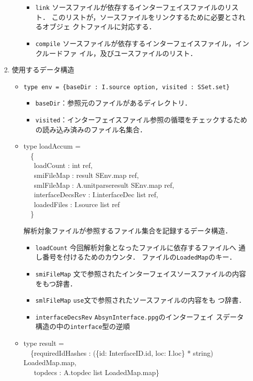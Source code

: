 \documentclass{jbook}
\newcommand{\code}[1]{\mbox{\large\tt #1}}
\newcommand{\myem}{\mbox{\ \ }}
\newenvironment{programPlain}{\begin{large}\begin{tt}}%
	                     {\end{tt}\end{large}}
\begin{document}
\begin{enumerate}
\begin{itemize}
\begin{itemize}
\item \code{link}
	ソースファイルが依存するインターフェイスファイルのリスト．
	このリストが，ソースファイルをリンクするために必要とされるオブジェ
クトファイルに対応する．

\item \code{compile}
	ソースファイルが依存するインターフェイスファイル，インクルードファ
イル，及びユースファイルのリスト．
\end{itemize}
\end{itemize}
\item 使用するデータ構造
\begin{itemize}
\item \code{type env = \{baseDir : I.source option, visited : SSet.set\}}
\begin{itemize}
\item \code{baseDir}：参照元のファイルがあるディレクトリ．
\item \code{visited}：インターフェイスファイル参照の循環をチェックするための読み込み済みのファイル名集合．
\end{itemize}
	
\item 
\begin{programPlain}
type loadAccum =\\
\myem      \{\\
\myem\         loadCount : int ref,\\
\myem\         smiFileMap : result SEnv.map ref,\\
\myem\         smlFileMap : A.unitparseresult SEnv.map ref,\\
\myem\         interfaceDecsRev : I.interfaceDec list ref,\\
\myem\         loadedFiles : I.source list ref\\
\myem       \}
\end{programPlain}

	解析対象ファイルが参照するファイル集合を記録するデータ構造．
\begin{itemize}
\item \code{loadCount} 今回解析対象となったファイルに依存するファイルへ
通し番号を付けるためのカウンタ．
	ファイルの\code{LoadedMap}のキー．
\item \code{smiFileMap} 文で参照されたインターフェイスソースファイルの内容をもつ辞書．
\item \code{smlFileMap} \code{use}文で参照されたソースファイルの内容をも
つ辞書．
\item \code{interfaceDecsRev} \code{AbsynInterface.ppg}のインターフェイ
スデータ構造の中の\code{interface}型の逆順
\end{itemize}
\item 
\begin{programPlain}
type result =\\
\myem \{requiredIdHashes : (\{id: InterfaceID.id, loc: I.loc\} * string) LoadedMap.map,\\
\myem\  topdecs : A.topdec list LoadedMap.map\}
\end{programPlain}


\end{itemize}
\end{enumerate}
\end{document}
